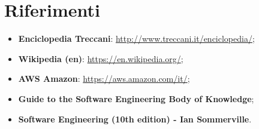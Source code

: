 \section{Riferimenti}

\begin{itemize}
\item \textbf{Enciclopedia Treccani}: \url{http://www.treccani.it/enciclopedia/};
\item \textbf{Wikipedia (en)}: \url{https://en.wikipedia.org/};
\item \textbf{AWS Amazon}: \url{https://aws.amazon.com/it/};
\item \textbf{Guide to the Software Engineering Body of Knowledge};
\item \textbf{Software Engineering (10th edition) - Ian Sommerville}.
\end{itemize}

\clearpage